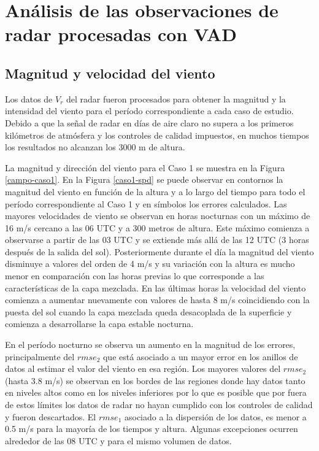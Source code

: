 \documentclass[12pt,spanish,oneside, a4paper]{book}
\begin{document}
\section{Análisis de las observaciones de radar procesadas con
VAD}\label{analisis-de-las-observaciones-de-radar-procesadas-con-vad}

\subsection{Magnitud y velocidad del
viento}\label{magnitud-y-velocidad-del-viento}

Los datos de \(V_r\) del radar fueron procesados para obtener la
magnitud y la intensidad del viento para el período correspondiente a
cada caso de estudio. Debido a que la señal de radar en días de aire
claro no supera a los primeros kilómetros de atmósfera y los controles
de calidad impuestos, en muchos tiempos los resultados no alcanzan los
3000 m de altura.

La magnitud y dirección del viento para el Caso 1 se muestra en la
Figura \ref{campo-caso1}. En la Figura \ref{caso1-spd} se puede observar
en contornos la magnitud del viento en función de la altura y a lo largo
del tiempo para todo el período correspondiente al Caso 1 y en símbolos
los errores calculados. Las mayores velocidades de viento se observan en
horas nocturnas con un máximo de 16 m/s cercano a las 06 UTC y a 300
metros de altura. Este máximo comienza a observarse a partir de las 03
UTC y se extiende más allá de las 12 UTC (3 horas después de la salida
del sol). Posteriormente durante el día la magnitud del viento disminuye
a valores del orden de 4 m/s y su variación con la altura es mucho menor
en comparación con las horas previas lo que corresponde a las
características de la capa mezclada. En las últimas horas la velocidad
del viento comienza a aumentar nuevamente con valores de hasta 8 m/s
coincidiendo con la puesta del sol cuando la capa mezclada queda
desacoplada de la superficie y comienza a desarrollarse la capa estable
nocturna.

En el período nocturno se observa un aumento en la magnitud de los
errores, principalmente del \(rmse_2\) que está asociado a un mayor
error en los anillos de datos al estimar el valor del viento en esa
región. Los mayores valores del \(rmse_2\) (hasta 3.8 m/s) se observan
en los bordes de las regiones donde hay datos tanto en niveles altos
como en los niveles inferiores por lo que es posible que por fuera de
estos límites los datos de radar no hayan cumplido con los controles de
calidad y fueron descartados. El \(rmse_1\) asociado a la dispersión de
los datos, es menor a 0.5 m/s para la mayoría de los tiempos y altura.
Algunas excepciones ocurren alrededor de las 08 UTC y para el mismo
volumen de datos.
\end{document}
